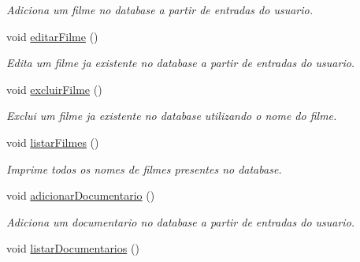 \begin{DoxyCompactItemize}
\begin{DoxyCompactList}\small\item\em Adiciona um filme no database a partir de entradas do usuario. \end{DoxyCompactList}\item 
void \hyperlink{classController_a2b1e0e97b5888d2afffb1aa26429d9b2}{editar\+Filme} ()\hypertarget{classController_a2b1e0e97b5888d2afffb1aa26429d9b2}{}\label{classController_a2b1e0e97b5888d2afffb1aa26429d9b2}

\begin{DoxyCompactList}\small\item\em Edita um filme ja existente no database a partir de entradas do usuario. \end{DoxyCompactList}\item 
void \hyperlink{classController_a43ee7965a996cd4ae8d9ae0638b5ce4f}{excluir\+Filme} ()\hypertarget{classController_a43ee7965a996cd4ae8d9ae0638b5ce4f}{}\label{classController_a43ee7965a996cd4ae8d9ae0638b5ce4f}

\begin{DoxyCompactList}\small\item\em Exclui um filme ja existente no database utilizando o nome do filme. \end{DoxyCompactList}\item 
void \hyperlink{classController_aa0344ce7ffd9f77dfbe46ae847736a6a}{listar\+Filmes} ()\hypertarget{classController_aa0344ce7ffd9f77dfbe46ae847736a6a}{}\label{classController_aa0344ce7ffd9f77dfbe46ae847736a6a}

\begin{DoxyCompactList}\small\item\em Imprime todos os nomes de filmes presentes no database. \end{DoxyCompactList}\item 
void \hyperlink{classController_a650b48667267003895f810591ad2bee0}{adicionar\+Documentario} ()\hypertarget{classController_a650b48667267003895f810591ad2bee0}{}\label{classController_a650b48667267003895f810591ad2bee0}

\begin{DoxyCompactList}\small\item\em Adiciona um documentario no database a partir de entradas do usuario. \end{DoxyCompactList}\item 
void \hyperlink{classController_a70aa8461ae785c75ae6f4cda12be73fd}{listar\+Documentarios} ()\hypertarget{classController_a70aa8461ae785c75ae6f4cda12be73fd}{}\label{classController_a70aa8461ae785c75ae6f4cda12be73fd}


\end{DoxyCompactItemize}
